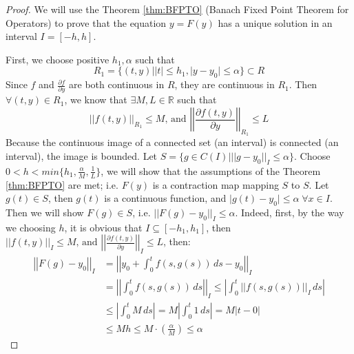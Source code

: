 \documentclass{article}
\theoremstyle{definition}
\theoremstyle{remark}
\theoremstyle{example}
\begin{document}
\begin{proof}
    \cite{r_kent_nagle_fundamentals_2011}We will use the Theorem \ref{thm:BFPTO} (Banach Fixed Point Theorem for Operators) to prove that the equation $y = F(y)$ has a unique solution in an interval $I = [-h, h]$. 

    First, we choose positive $h_1, \alpha$ such that 
    \begin{equation}
        R_1 = \{(t,y)\lvert \lvert t \rvert \leq h_1, \lvert y - y_0 \rvert \leq \alpha\} \subset R
    \end{equation}
    Since $f$ and $\tfrac{\partial f}{\partial y}$ are both continuous in $R$, they are continuous in $R_1$. Then $\forall (t,y) \in R_1$, we know that $\exists M, L \in \mathbb{R}$ such that
    \begin{equation}\label{eqn:bddAssumption}
        \lvert\lvert f(t,y) \rvert\rvert_{R_1} \leq M \text{, and }\left\lvert\left\lvert \dfrac{\partial f(t,y)}{\partial y} \right\rvert\right\rvert_{R_1} \leq L
    \end{equation}
    Because the continuous image of a connected set (an interval) is connected (an interval), the image is bounded. Let $S = \{g \in C(I) \lvert \lvert \lvert g - y_0\rvert\rvert_{I} \leq \alpha\}$. Choose $0 < h < min\{h_1, \tfrac{\alpha}{M}, \tfrac{1}{L}\}$, we will show that the assumptions of the Theorem \ref{thm:BFPTO} are met; i.e. $F(y)$ is a contraction map mapping $S$ to $S$.
    Let $g(t) \in S$, then $g(t)$ is a continuous function, and $\lvert g(t) - y_0 \rvert \leq \alpha\; \forall x \in I$. Then we will show $F(g) \in S$, i.e. $\lvert\lvert F(g) - y_0 \rvert\rvert_{I} \leq \alpha$. Indeed, first, by the way we choosing $h$, it is obvious that $I \subseteq [-h_1, h_1]$, then $\lvert\lvert f(t,y) \rvert\rvert_{I} \leq M \text{, and }\left\lvert\left\lvert \tfrac{\partial f(t,y)}{\partial y} \right\rvert\right\rvert_{I} \leq L$, then: 
    \begin{align}
        \left\lvert\left\lvert F(g) - y_0 \right\rvert\right\rvert_{I} &= \left\lvert\left\lvert y_0 + \int_{0}^{t}{f(s,g(s))}\,ds - y_0\right\rvert\right\rvert_{I}\\
        &=\left\lvert\left\lvert \int_{0}^{t}{f(s,g(s))}\,ds\right\rvert\right\rvert_{I} \leq \left\lvert\int_{0}^{t}{\lvert\lvert f(s,g(s))\rvert\rvert_{I}}\,ds\right\rvert\\
        &\leq \left\lvert\int_{0}^{t}{M}\,ds\right\rvert = M\left\lvert \int_{0}^{t}{1}\,ds\right\rvert = M\lvert t - 0\rvert\\
        &\leq Mh \leq M\cdot (\tfrac{\alpha}{M}) \leq \alpha

\end{align}
\end{proof}
\end{document}
